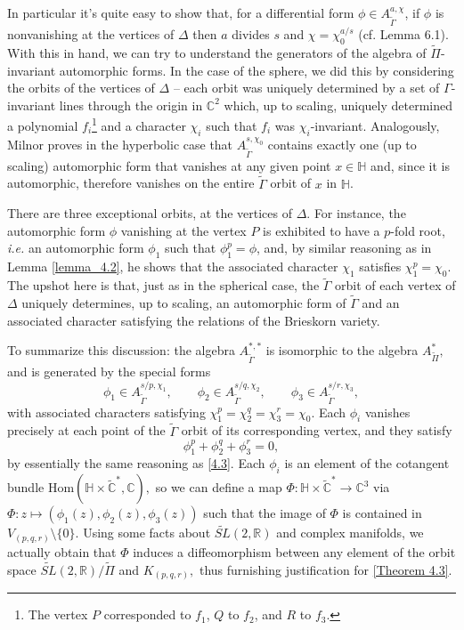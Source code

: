 \documentclass{article}
\begin{document}
In particular it's quite easy to show that, for a differential form $\phi \in A_{\widetilde{\Gamma}}^{a, \chi}$, if $\phi$ is nonvanishing at the vertices of $\Delta$ then $a$ divides $s$ and $\chi = \chi_0^{a/s}$ (cf. \cite{milnor_1975} Lemma 6.1). With this in hand, we can try to understand the generators of the algebra of $\widetilde{\Pi}$-invariant automorphic forms. In the case of the sphere, we did this by considering the orbits of the vertices of $\Delta$ -- each orbit was uniquely determined by a set of $\Gamma$-invariant lines through the origin in $\mathbb{C}^2$ which, up to scaling, uniquely determined a polynomial $f_i$\footnote{The vertex $P$ corresponded to $f_1$, $Q$ to $f_2$, and $R$ to $f_3$.} and a character $\chi_i$ such that $f_i$ was $\chi_i$-invariant. Analogously, Milnor proves in the hyperbolic case that $A_{\widetilde{\Gamma}}^{s, \chi_0}$ contains exactly one (up to scaling) automorphic form that vanishes at any given point $x \in \mathbb{H}$ and,  since it is automorphic, therefore vanishes on the entire $\widetilde{\Gamma}$ orbit of $x$ in $\mathbb{H}$. 

There are three exceptional orbits, at the vertices of $\Delta$. For instance, the automorphic form $\phi$ vanishing at the vertex $P$ is exhibited to have a $p$-fold root, \textit{i.e.} an automorphic form $\phi_1$ such that $\phi_1^p = \phi$, and, by similar reasoning as in Lemma \ref{lemma_4.2}, he shows that the associated character $\chi_1$ satisfies $\chi_1^p = \chi_0$. The upshot here is that, just as in the spherical case, the $\widetilde{\Gamma}$ orbit of each vertex of $\Delta$ uniquely determines, up to scaling, an automorphic form of $\widetilde{\Gamma}$ and an associated character satisfying the relations of the Brieskorn variety.

To summarize this discussion: the algebra $A_{\widetilde{\Gamma}}^{\ast, \ast}$ is isomorphic to the algebra $A_{\widetilde{\Pi}}^\ast,$ and is generated by the special forms
\[\phi_1 \in A_{\widetilde{\Gamma}}^{s/p,\chi_1}, \qquad \phi_2 \in A_{\widetilde{\Gamma}}^{s/q,\chi_2}, \qquad \phi_3 \in A_{\widetilde{\Gamma}}^{s/r,\chi_3},\]
with associated characters satisfying $\chi_1^p = \chi_2^q = \chi_3^r = \chi_0.$ Each $\phi_i$ vanishes precisely at each point of the $\widetilde{\Gamma}$ orbit of its corresponding vertex, and they satisfy
\[\phi_1^p + \phi_2^q + \phi_3^r = 0,\]
by essentially the same reasoning as \ref{4.3}. Each $\phi_i$ is an element of the cotangent bundle $\textrm{Hom}(\mathbb{H} \times \widetilde{\mathbb{C}}^*, \mathbb{C}),$ so we can define a map $\Phi: \mathbb{H} \times \widetilde{\mathbb{C}}^* \to \mathbb{C}^3$ via $\Phi: z \mapsto (\phi_1(z), \phi_2(z), \phi_3(z))$ such that the image of $\Phi$ is contained in $V_{(p,q,r)} \setminus \{0\}$. Using some facts about $\widetilde{SL}(2, \mathbb{R})$ and complex manifolds, we actually obtain that $\Phi$ induces a diffeomorphism between any element of the orbit space $\widetilde{SL}(2, \mathbb{R})/\widetilde{\Pi}$ and $K_{(p,q,r)},$ thus furnishing justification for \ref{Theorem 4.3}.
\end{document}
